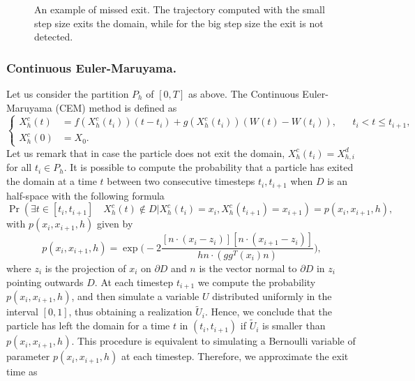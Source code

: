 \begin{figure}[t]
    \centering
    \resizebox{0.6\linewidth}{!}{ }  
    \caption{An example of missed exit. The trajectory computed with the small step size exits the domain, while for the big step size the exit is not detected.}
    \label{fig:MissedExit}
\end{figure}
 
\subsubsection{Continuous Euler-Maruyama. }
Let us consider the partition $P_h$ of $[0,T]$ as above. The Continuous Euler-Maruyama (CEM) method is defined as
\begin{equation}\label{eq:CEM}
	\left \{
	\begin{aligned}
		X_h^c(t) &= f(X_h^c(t_i))(t-t_i) + g(X_h^c(t_i))(W(t) - W(t_{i})),  && t_i < t \leq t_{i+1},\\
		X_h^c(0) &= X_0.
	\end{aligned} \right .
\end{equation} 
Let us remark that in case the particle does not exit the domain, $X_h^c(t_i) = X_{h,i}^d$ for all $t_i \in P_h$. It is possible to compute the probability that a particle has exited the domain at a time $t$ between two consecutive timesteps $t_i,t_{i+1}$ when $D$ is an half-space with the following formula \cite{Gobet2001}
\begin{equation}\label{eq:CEMProb}
	\Pr (\exists t \in [ t_i,t_{i+1} ] \quad X_h^c(t) \notin D | X_h^c(t_i) = x_i, X_h^c(t_{i+1}) = x_{i+1}) = p(x_i,x_{i+1},h),
\end{equation}
with $p(x_i,x_{i+1},h)$ given by
\begin{equation}\label{eq:CEMProbHalfSpace}
	p(x_i,x_{i+1},h) = \exp\Big(-2\frac{[n\cdot(x_i - z_i)][n\cdot(x_{i+1} - z_i)]}{hn\cdot (gg^T(x_i)n)}\Big),
\end{equation}
where $z_i$ is the projection of $x_i$ on $\partial D$ and $n$ is the vector normal to $\partial D$ in $z_i$ pointing outwards $D$. At each timestep $t_{i+1}$ we compute the probability $p(x_i,x_{i+1},h)$, and then simulate a variable $U$ distributed uniformly in the interval $\left[0,1\right]$, thus obtaining a realization $\tilde U_i$. Hence, we conclude that the particle has left the domain for a time $t$ in $(t_i,t_{i+1})$ if $\tilde U_i$ is smaller than $p(x_i,x_{i+1},h)$. This procedure is equivalent to simulating a Bernoulli variable of parameter $p(x_i,x_{i+1},h)$ at each timestep. Therefore, we approximate the exit time as

